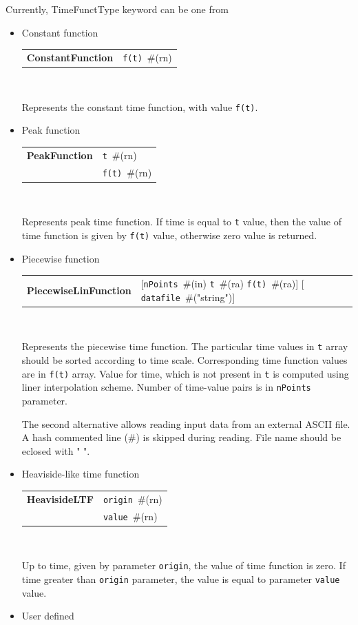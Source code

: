 \documentclass[a4paper]{article}
\makeatletter
\newcommand{\param}[1]{\texttt{#1}} %
\newcommand{\field}[2]{\param{#1}~\#{\tiny(#2)}} %
\newcommand{\entKeywordInst}[1]{\textbf{#1}} %
\newenvironment{record}[1][]{\begin{tabular}{|ll}}{\end{tabular}\\}
\newcommand{\recentry}[2]{{#1}&{#2}\\}
\newcounter{rcc}
\newenvironment{record}[1][\textwidth]{\setcounter{rcc}{0}\begin{tabular*}{#1}{|ll@{\extracolsep{\fill}}r}}{\end{tabular*}\\}
\newcommand{\recentry}[2]{\ifthenelse{\value{rcc}>0}{&$\backslash$ \\}{\setcounter{rcc}{1}}{#1}&{#2}}
\makeatother
\begin{document}
Currently, TimeFunctType keyword can be one from
\begin{itemize}
\item Constant function

\noindent
\begin{record}[0.9\textwidth]
  \recentry{\entKeywordInst{ConstantFunction}}{\field{f(t)}{rn}}
\end{record}

Represents the constant time function, with value \param{f(t)}.

\item Peak function

\begin{record}[0.9\textwidth]
  \recentry{\entKeywordInst{PeakFunction}}{\field{t}{rn}}
  \recentry{}{\field{f(t)}{rn}}
\end{record}

Represents peak time function. If time is equal to \param{t}
value, then the value of time function is given by \param{f(t)} value,
otherwise zero value is returned.

\item Piecewise function

\begin{record}[0.9\textwidth]
  \recentry{\entKeywordInst{PiecewiseLinFunction}}{[\field{nPoints}{in} {\field{t}{ra} \field{f(t)}{ra}}] [ \field{datafile}{"string"}]}
\end{record}

Represents the piecewise time function. The particular time values in
\param{t} array should be sorted according to time scale. Corresponding time
function values are in \param{f(t)} array. Value for time, which
is not present in \param{t} is computed using liner interpolation scheme.
Number of time-value pairs is in \param{nPoints} parameter.

The second alternative allows reading input data from an external ASCII file. A hash commented line (\#) is 
skipped during reading. File name should be eclosed with " ".


\item Heaviside-like time function

\begin{record}[0.9\textwidth]
  \recentry{\entKeywordInst{HeavisideLTF}}{\field{origin}{rn}}
  \recentry{}{\field{value}{rn}}
\end{record}

Up to time, given by
parameter \param{origin}, the value of time function is zero. If time
greater than \param{origin} parameter, the value is
equal to parameter \param{value} value.
\item User defined


\end{itemize}
\end{document}
